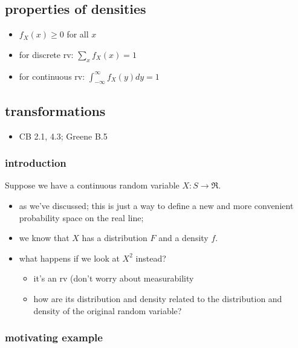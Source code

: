 \documentclass[11pt]{article}
\begin{document}
\subsection{properties of densities}
\label{sec-3-4}

\begin{itemize}
\item $f_X(x) \geq 0$ for all $x$
\item for discrete rv: $\sum_x f_X(x) = 1$
\item for continuous rv: $\int_{-\infty}^{\infty} f_X(y) dy = 1$
\end{itemize}
\subsection{transformations}
\label{sec-3-5}

\begin{itemize}
\item CB 2.1, 4.3; Greene B.5
\end{itemize}
\subsubsection{introduction}
\label{sec-3-5-1}

      Suppose we have a continuous random variable $X: S \to \Re$.
\begin{itemize}
\item as we've discussed; this is just a way to define a new and more
        convenient probability space on the real line;
\item we know that $X$ has a distribution $F$ and a density $f$.
\item what happens if we look at $X^2$ instead?
\begin{itemize}
\item it's an rv (don't worry about measurability
\item how are its distribution and density related to the distribution
          and density of the original random variable?
\end{itemize}
\end{itemize}
\subsubsection{motivating example}
\label{sec-3-5-2}
\end{document}
